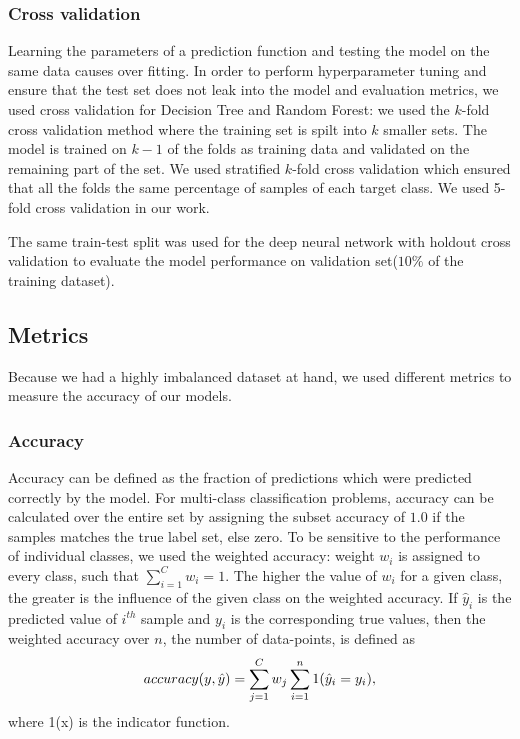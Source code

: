 \documentclass[sigconf]{acmart}
\begin{document}
\subsubsection{Cross validation} Learning the parameters of a prediction function and testing the model on the same data causes over fitting. In order to perform hyperparameter tuning and ensure that the test set does not leak into the model and evaluation metrics, we used cross validation for Decision Tree and Random Forest: we used the $k$-fold cross validation method where the training set is spilt into $k$ smaller sets. The model is trained on $k -1$ of the folds as training data and validated on the remaining part of the set. We used stratified $k$-fold cross validation which ensured that all the folds the same percentage of samples of each target class. We used 5-fold cross validation in our work.

The same train-test split was used for the deep neural network with holdout cross validation to evaluate the model performance on validation set($10\%$ of the training dataset).

\subsection{Metrics}
Because we had a highly imbalanced dataset at hand, we used different metrics to measure the accuracy of our models.
\subsubsection{Accuracy} 
Accuracy can be defined as the fraction of predictions which were predicted correctly by the model. For multi-class classification problems, accuracy can be calculated over the entire set by assigning the subset accuracy of $1.0$ if the samples matches the true label set, else zero. To be sensitive to the performance of individual classes, we used the weighted accuracy: weight $w_i$ is assigned to every class, such that $\sum_{i=1}^{C} w_i = 1$. The higher the value of $w_i$ for a given class, the greater is the influence of the given class on the weighted accuracy. If $\hat{y}_{i}$ is the predicted value of $i^{th}$ sample and $y_i$ is the corresponding true values, then the weighted accuracy over $n$, the number of data-points, is defined as \cite{scikit-learn}
\begin{equation}
\notag
accuracy(y,\hat{y}) = \sum_{j=1}^{C} w_j \sum_{i=1}^{n} 1(\hat{y}_i=y_i),
\end{equation}
where 1(x) is the indicator function.
\end{document}
